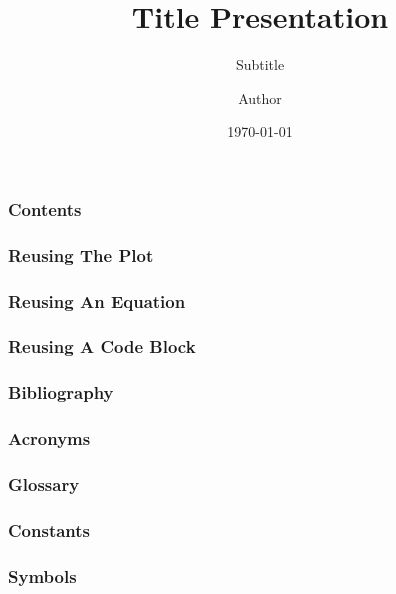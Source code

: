 \documentclass{beamer}
\title{Title Presentation}
\subtitle{Subtitle}
\author{Author}
\date{\today}
\begin{document}
    \begin{frame}
        \titlepage
    \end{frame}
    \begin{frame}
        \frametitle{Contents}
        \tableofcontents
    \end{frame}
    \begin{frame}
        \frametitle{Reusing The Plot}
    \end{frame}
    \begin{frame}
        \frametitle{Reusing An Equation}
    \end{frame}
    \begin{frame}[fragile]
        \frametitle{Reusing A Code Block}
    \end{frame}
    \begin{frame}[allowframebreaks]
        \frametitle{Bibliography}
        \printbibliography
    \end{frame}
    \begin{frame}[allowframebreaks]
        \frametitle{Acronyms}
        \printglossary[type=\acronymtype]
    \end{frame}
    \begin{frame}[allowframebreaks]
        \frametitle{Glossary}
        \printglossary[type=main]
    \end{frame}
    \begin{frame}[allowframebreaks]
        \frametitle{Constants}
        \printglossary[type=constants, nonumberlist, nopostdot]
    \end{frame}
    \begin{frame}[allowframebreaks]
        \frametitle{Symbols}
        \printglossary[type=symbols]
    \end{frame}
\end{document}
